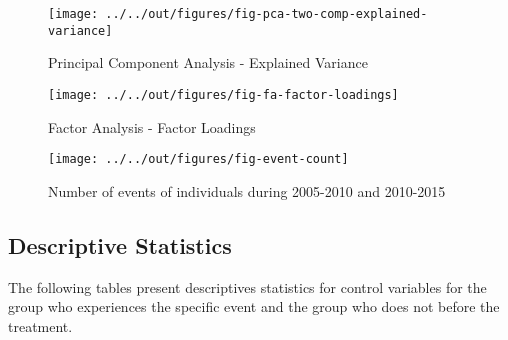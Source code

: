 \documentclass[12pt, a4paper, fleqn, parskip]{scrartcl}
\begin{document}
\begin{figure}[H]
    \centering
    \texttt{[image: ../../out/figures/fig-pca-two-comp-explained-variance]}
    \caption{Principal Component Analysis - Explained Variance}
    \label{fig:pca_ev}
\end{figure}

\begin{figure}[H]
    \centering
    \texttt{[image: ../../out/figures/fig-fa-factor-loadings]}
    \caption{Factor Analysis - Factor Loadings}
    \label{fig:fa_loadings}
\end{figure}

\begin{figure}[H]
    \centering
    \texttt{[image: ../../out/figures/fig-event-count]}
    \caption{Number of events of individuals during 2005-2010 and 2010-2015}
    \label{fig:events_count}
\end{figure}



\subsection{Descriptive Statistics} %
\label{sub:descriptive_statistics}

The following tables present descriptives statistics for control variables for
the group who experiences the specific event and the group who does not before
the treatment.
















\end{document}
